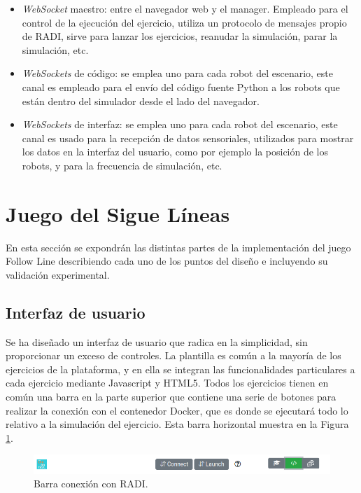 \documentclass[a4paper, 12pt]{book}
\begin{document}
\begin{itemize}
\item \emph{WebSocket} maestro: entre el navegador web y el manager. Empleado para el control de la ejecución del ejercicio, utiliza un protocolo de mensajes propio de RADI, sirve para lanzar los ejercicios, reanudar la simulación, parar la simulación, etc.
\item \emph{WebSockets} de código: se emplea uno para cada robot del escenario, este canal es empleado para el envío del código fuente Python a los robots que están dentro del simulador desde el lado del navegador.
\item \emph{WebSockets} de interfaz: se emplea uno para cada robot del escenario, este canal es usado para la recepción de datos sensoriales, utilizados para mostrar los datos en la interfaz del usuario, como por ejemplo la posición de los robots, y para la frecuencia de simulación, etc.
\end{itemize}

\section{Juego del Sigue Líneas} 
\label{sec:follow_line_game}

En esta sección se expondrán las distintas partes de la implementación del juego Follow Line describiendo cada uno de los puntos del diseño e incluyendo su validación experimental.

\subsection{Interfaz de usuario}

Se ha diseñado un interfaz de usuario que radica en la simplicidad, sin proporcionar un exceso de controles. La plantilla es común a la mayoría de los ejercicios de la plataforma, y en ella se integran las funcionalidades particulares a cada ejercicio mediante Javascript y HTML5. Todos los ejercicios tienen en común una barra en la parte superior que contiene una serie de botones para realizar la conexión con el contenedor Docker, que es donde se ejecutará todo lo relativo a la simulación del ejercicio. Esta barra horizontal muestra en la Figura \ref{figura:conexion_radi}.

\begin{figure}[H]
	\centering
    \includegraphics[width=15cm]{img/barra_radi.png}
    \caption{Barra conexión con RADI.}
    \label{figura:conexion_radi}
\end{figure}
\end{document}
